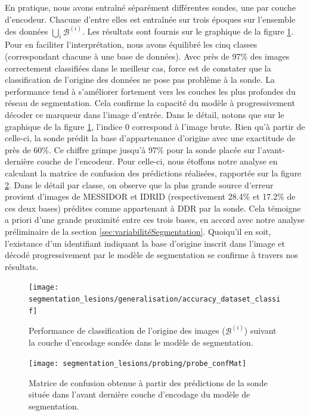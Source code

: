 En pratique, nous avons entraîné séparément différentes sondes, une par couche d'encodeur. Chacune d'entre elles est entraînée sur trois époques sur l'ensemble des données $\bigcup_i \mathcal{B}^{(i)}$. Les résultats sont fournis sur le graphique de la figure \ref{fig:classifDataset}. Pour en faciliter l'interprétation, nous avons équilibré les cinq classes (correspondant chacune à une base de données). Avec près de 97\% des images correctement classifiées dans le meilleur cas, force est de constater que la classification de l'origine des données ne pose pas problème à la sonde. La performance tend à s'améliorer fortement vers les couches les plus profondes du réseau de segmentation. Cela confirme la capacité du modèle à progressivement décoder ce marqueur dans l'image d'entrée. Dans le détail, notons que sur le graphique de la figure \ref{fig:classifDataset}, l'indice 0 correspond à l'image brute. Rien qu'à partir de celle-ci, la sonde prédit la base d'appartenance d'origine avec une exactitude de près de 60\%. Ce chiffre grimpe jusqu'à 97\% pour la sonde placée sur l'avant-dernière couche de l'encodeur. Pour celle-ci, nous étoffons notre analyse en calculant la matrice de confusion des prédictions réalisées, rapportée sur la figure \ref{fig:confMatProbeRef}. Dans le détail par classe, on observe que la plus grande source d'erreur provient d'images de MESSIDOR et IDRID (respectivement 28.4\% et 17.2\% de ces deux bases) prédites comme appartenant à DDR par la sonde. Cela témoigne a priori d'une grande proximité entre ces trois bases, en accord avec notre analyse préliminaire de la section \ref{sec:variabilitéSegmentation}.
Quoiqu'il en soit, l'existance d'un identifiant indiquant la base d'origine inscrit dans l'image et décodé progressivement par le modèle de segmentation se confirme à travers nos résultats.

\begin{figure}
	\centering
	\texttt{[image: segmentation\_lesions/generalisation/accuracy\_dataset\_classif]}
	\caption{Performance de classification de l'origine des images ($\mathcal{B}^{(i)}$) suivant la couche d'encodage sondée dans le modèle de segmentation.}
	\label{fig:classifDataset}
\end{figure}

\begin{figure}
	\centering
	\texttt{[image: segmentation\_lesions/probing/probe\_confMat]}
	\caption{Matrice de confusion obtenue à partir des prédictions de la sonde située dans l'avant dernière couche d'encodage du modèle de segmentation.}
	\label{fig:confMatProbeRef}
\end{figure}



